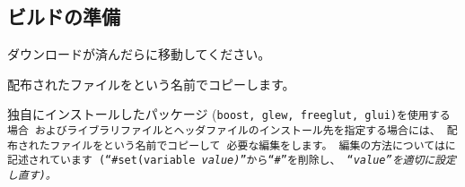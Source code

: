 \newpage
\subsection{ビルドの準備}
\label{subsec:Preparation}

\noindent
ダウンロードが済んだらに移動してください。

\noindent
配布されたファイルを\CMakeLists{}という名前でコピーします。


\medskip
\noindent
独自にインストールしたパッケージ
(\tt{boost}, \tt{glew}, \tt{freeglut}, \tt{glui})を使用する場合
およびライブラリファイルとヘッダファイルのインストール先を指定する場合には、
配布されたファイルを\CMakeConf{}という名前でコピーして
必要な編集をします。
編集の方法については\CMakeConf{}に記述されています
(``\tt{\#set(variable \it{value})}''から``\tt{\#}''を削除し、
``\it{value}''を適切に設定し直す)。

